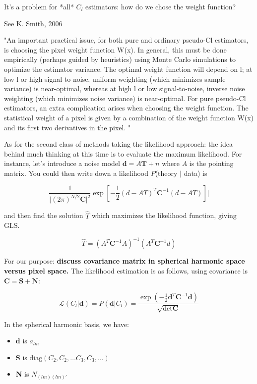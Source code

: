 \documentclass[a4paper, 11pt]{article}
\begin{document}
It's a problem for *all* $C_l$ estimators: how do we chose the weight function? 

See K. Smith, 2006

"An important practical issue, for both pure and ordinary pseudo-Cl estimators, is choosing the pixel weight function W(x). In general, this must be done empirically (perhaps guided by heuristics) using Monte Carlo simulations to optimize the estimator variance. The optimal weight function will depend on l; at low l or high signal-to-noise, uniform weighting (which minimizes sample variance) is near-optimal, whereas at high l or low signal-to-noise, inverse noise weighting (which minimizes noise variance) is near-optimal. For pure pseudo-Cl estimators, an extra complication arises when choosing the weight function. The statistical weight of a pixel is given by a combination of the weight function W(x) and its first two derivatives in the pixel.  "

As for the second class of methods taking the likelihood approach: the idea behind much thinking at this time is to evaluate the maximum likelihood. For instance, let's introduce a noise model $\textbf{d}=A\textbf{T}+n$ where $A$ is the pointing matrix. You could then write down a likelihood $P$(theory $\vert$ data) is 

$$
\frac{1}{\vert(2\pi)^{N/2}\textbf{C}\vert^2}\exp[-\frac{1}{2}(d-AT)^{T}\textbf{C}^{-1}(d-AT)]]
$$

and then find the solution $\hat{T}$ which maximizes the likelihood function, giving GLS. 

$$
\hat{T}=(A^{T}\textbf{C}^{-1}A)^{-1}(A^{T}\textbf{C}^{-1}d)
$$

For our purpose: \textbf{discuss covariance matrix in spherical harmonic space versus pixel space.} 
The likelihood estimation is as follows, using covariance is $\textbf{C}=\textbf{S}+\textbf{N}$:

$$
\mathcal{L}(C_l\vert \textbf{d})=P(\textbf{d}\vert C_l) = \frac{\exp(-\frac{1}{2}\textbf{d}^{T}\textbf{C}^{-1}\textbf{d})}{\sqrt{\text{det}\textbf{C}}}
$$

In the spherical harmonic basis, we have: 
\begin{itemize}
\item[]\textbf{d} is $a_{lm}$
\item[]\textbf{S} is $\text{diag}(C_2, C_2,\dots C_3, C_3, \dots)$
\item[]\textbf{N} is $N_{(lm)(lm)'}$
\end{itemize}
\end{document}
